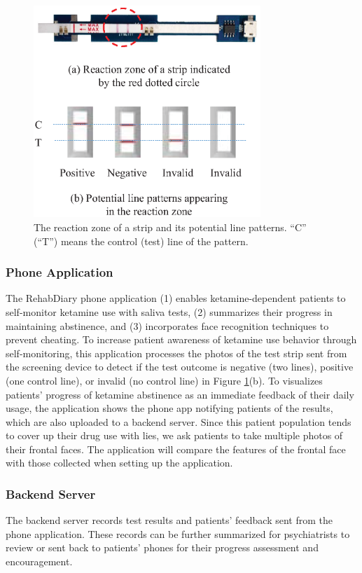 \begin{figure}[ht]
\begin{center}
\includegraphics[height=8cm]{image/ket/line_pattern.eps}
\caption{The reaction zone of a strip and its potential line patterns. ``C'' (``T'') means the control (test) line of the pattern.}
\label{fig:line_pattern}
\end{center}
\end{figure}

\subsubsection{Phone Application}
The RehabDiary phone application (1) enables ketamine-dependent patients to self-monitor ketamine use with saliva tests, (2) summarizes their progress in maintaining abstinence, and (3) incorporates face recognition techniques to prevent cheating. To increase patient awareness of ketamine use behavior through self-monitoring, this application processes the photos of the test strip sent from the screening device to  detect if the test outcome is negative (two lines), positive (one control line), or invalid (no control line) in Figure \ref{fig:line_pattern}(b). To visualizes patients' progress of ketamine abstinence as an immediate feedback of their daily usage, the application shows the phone app notifying patients of the results, which are also uploaded to a backend server. Since this patient population tends to cover up their drug use with lies, we ask patients to take multiple photos of their frontal faces. The application will compare the features of the frontal face with those collected when setting up the application. 


\subsubsection{Backend Server}
The backend server records test results and patients' feedback sent from the phone application. These records can be further summarized for psychiatrists to review or sent back to patients' phones for their progress assessment and encouragement.

